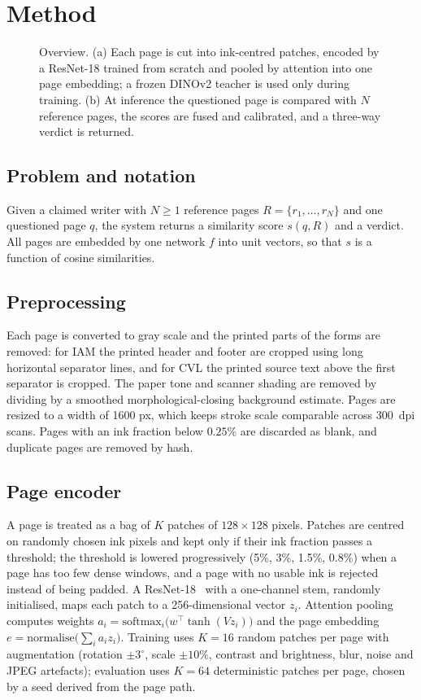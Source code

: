 \section{Method}
\begin{figure}[t]
\centering
\resizebox{\textwidth}{!}{}
\caption{Overview. (a) Each page is cut into ink-centred patches, encoded by a ResNet-18 trained from scratch and pooled by attention into one page embedding; a frozen DINOv2 teacher is used only during training. (b) At inference the questioned page is compared with $N$ reference pages, the scores are fused and calibrated, and a three-way verdict is returned.}
\label{fig:arch}
\end{figure}

\subsection{Problem and notation}
Given a claimed writer with $N\ge1$ reference pages $R=\{r_1,\dots,r_N\}$ and one questioned page $q$, the system returns a similarity score $s(q,R)$ and a verdict.
All pages are embedded by one network $f$ into unit vectors, so that $s$ is a function of cosine similarities.

\subsection{Preprocessing}
Each page is converted to gray scale and the printed parts of the forms are removed: for IAM the printed header and footer are cropped using long horizontal separator lines, and for CVL the printed source text above the first separator is cropped.
The paper tone and scanner shading are removed by dividing by a smoothed morphological-closing background estimate.
Pages are resized to a width of 1600 px, which keeps stroke scale comparable across 300~dpi scans.
Pages with an ink fraction below $0.25\%$ are discarded as blank, and duplicate pages are removed by hash.

\subsection{Page encoder}
A page is treated as a bag of $K$ patches of $128\times128$ pixels.
Patches are centred on randomly chosen ink pixels and kept only if their ink fraction passes a threshold; the threshold is lowered progressively (5\%, 3\%, 1.5\%, 0.8\%) when a page has too few dense windows, and a page with no usable ink is rejected instead of being padded.
A ResNet-18~\cite{he2015deep} with a one-channel stem, randomly initialised, maps each patch to a 256-dimensional vector $z_i$.
Attention pooling~\cite{ilse2018attentionbased} computes weights $a_i=\mathrm{softmax}_i\big(w^\top\tanh(Vz_i)\big)$ and the page embedding $e=\mathrm{normalise}\big(\sum_i a_i z_i\big)$.
Training uses $K=16$ random patches per page with augmentation (rotation $\pm3^\circ$, scale $\pm10\%$, contrast and brightness, blur, noise and JPEG artefacts); evaluation uses $K=64$ deterministic patches per page, chosen by a seed derived from the page path.

